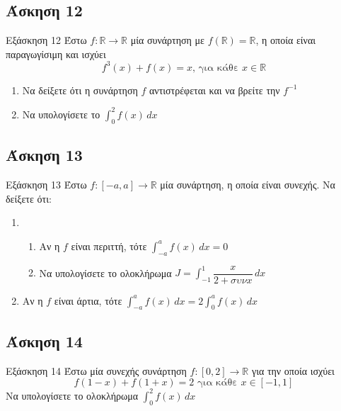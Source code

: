 \documentclass[greek]{beamer}
\begin{document}
\subsection{Άσκηση 12}
\begin{frame}[label=Άσκηση12,t]{Εξάσκηση 12}
  Έστω $f:\mathbb{R}\to\mathbb{R}$ μία συνάρτηση με $f(\mathbb{R})=\mathbb{R}$, η οποία είναι παραγωγίσιμη και ισχύει
  $$f^3(x)+f(x)=x \text{, για κάθε } x\in\mathbb{R}$$
  \begin{enumerate}
    \item<1-> Να δείξετε ότι η συνάρτηση $f$ αντιστρέφεται και να βρείτε την $f^{-1}$
    \item<2-> Να υπολογίσετε το $\int_{0}^{2} f(x) \,dx$
  \end{enumerate}

\end{frame}

\subsection{Άσκηση 13}
\begin{frame}[label=Άσκηση13,t]{Εξάσκηση 13}
  Έστω $f:[-a,a]\to\mathbb{R}$ μία συνάρτηση, η οποία είναι συνεχής. Να δείξετε ότι:
  \begin{enumerate}
    \item
          \begin{enumerate}
            \item<1-> Αν η $f$ είναι περιττή, τότε $\int_{-a}^{a} f(x) \,dx=0$
            \item<2-> Να υπολογίσετε το ολοκλήρωμα $J=\int_{-1}^{1} \dfrac{x}{2+συνx} \,dx$
          \end{enumerate}
    \item<3-> Αν η $f$ είναι άρτια, τότε $\int_{-a}^{a} f(x) \,dx=2\int_{0}^{a} f(x) \,dx$
  \end{enumerate}

\end{frame}

\subsection{Άσκηση 14}
\begin{frame}[label=Άσκηση14,t]{Εξάσκηση 14}
  Έστω μία συνεχής συνάρτηση $f:[0,2]\to\mathbb{R}$ για την οποία ισχύει
  $$f(1-x)+f(1+x)=2\text{ για κάθε }x\in [-1,1]$$
  Να υπολογίσετε το ολοκλήρωμα $\int_{0}^{2} f(x) \,dx$

\end{frame}
\end{document}
